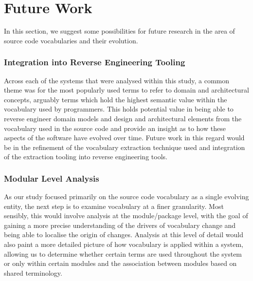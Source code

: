 \section{Future Work} %
\label{sec:future_work}

In this section, we suggest some possibilities for future research in the area of source code vocabularies and their evolution.

\subsubsection{Integration into Reverse Engineering Tooling} %
\label{ssub:integration_into_reverse_engineering_tooling}

Across each of the systems that were analysed within this study, a common theme was for the most popularly used terms to refer to domain and architectural concepts, arguably terms which hold the highest semantic value within the vocabulary used by programmers. This holds potential value in being able to reverse engineer domain models and design and architectural elements from the vocabulary used in the source code and provide an insight as to how these aspects of the software have evolved over time. Future work in this regard would be in the refinement of the vocabulary extraction technique used and integration of the extraction tooling into reverse engineering tools.


\subsubsection{Modular Level Analysis} %
\label{ssub:modular_level_analysis}

As our study focused primarily on the source code vocabulary as a single evolving entity, the next step is to examine vocabulary at a finer granularity. Most sensibly, this would involve analysis at the module/package level, with the goal of gaining a more precise understanding of the drivers of vocabulary change and being able to localise the origin of changes. Analysis at this level of detail would also paint a more detailed picture of how vocabulary is applied within a system, allowing us to determine whether certain terms are used throughout the system or only within certain modules and the association between modules based on shared terminology.


